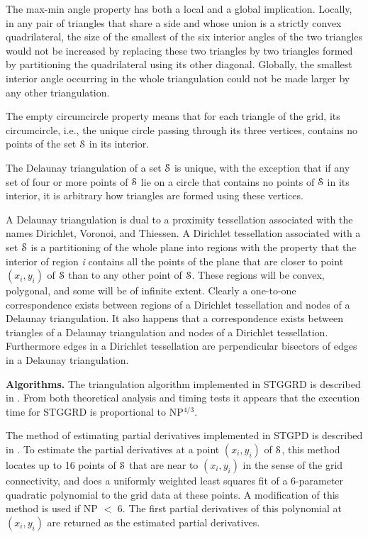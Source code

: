 \documentclass[twoside]{MATH77}
\begin{document}
The max-min angle property has both a local and a global implication.
Locally, in any pair of triangles that share a side and whose union
is a strictly convex quadrilateral, the size of the smallest of the
six interior angles of the two triangles would not be increased by
replacing these two triangles by two triangles formed by
partitioning the quadrilateral using its other diagonal.
Globally, the smallest interior angle occurring in the whole triangulation
could not be made larger by any other triangulation.

The empty circumcircle property means that for each triangle of the grid,
its circumcircle, i.e., the unique circle passing through its three
vertices, contains no points of the set {$\EuScript S$} in its interior.

The Delaunay triangulation of a set {$\EuScript S$} is unique, with the
exception that if any set of four or more points of {$\EuScript S$} lie
on a circle that contains no points of {$\EuScript S$} in its interior,
it is arbitrary how triangles are formed using these vertices.

A Delaunay triangulation is dual to a proximity tessellation
associated with the names Dirichlet, Voronoi, and Thiessen.
A Dirichlet tessellation associated with a set {$\EuScript S$} is
a partitioning of the whole plane into regions with the property that
the interior of region {\em i} contains all the points of the plane that
are closer to point $(x_i, y_i)$ of {$\EuScript S$} than to any other
point of {$\EuScript S$}.  These regions will be convex, polygonal, and
some will be of infinite extent.  Clearly a one-to-one correspondence
exists between regions of a Dirichlet tessellation and nodes of a
Delaunay triangulation.  It also happens that a correspondence exists
between triangles of a Delaunay triangulation and nodes of a
Dirichlet tessellation.  Furthermore  edges in a Dirichlet tessellation
are perpendicular bisectors of edges in a Delaunay triangulation.

{\bf Algorithms.} The triangulation algorithm implemented in STGGRD is
described in \cite{Lawson:SC1:1977}.  From both theoretical analysis and
timing tests it appears that the execution time for STGGRD is proportional
to NP$^{4/3}$.

The method of estimating partial derivatives implemented in STGPD is
described in \cite{Lawson:SC1:1977}.  To estimate the partial derivatives
at a point $(x_i, y_i)$ of {$\EuScript S$}, this method locates up to 16
points of {$\EuScript S$} that are near to $(x_i, y_i)$ in the sense of
the grid connectivity, and does a uniformly weighted least squares fit of
a 6-parameter quadratic polynomial to the grid data at these points.  A
modification of this method is used if NP $<$ 6.  The first partial
derivatives of this polynomial at $(x_i, y_i)$ are returned as the
estimated partial derivatives.
\end{document}
